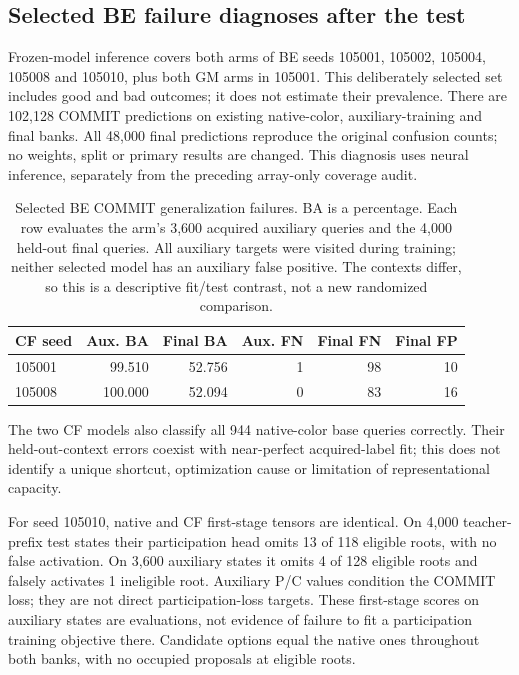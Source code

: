 \subsection{Selected BE failure diagnoses after the test}\label{app:be-failure-diagnostics}
Frozen-model inference covers both arms of BE seeds 105001, 105002, 105004,
105008 and 105010, plus both GM arms in 105001. This deliberately selected
set includes good and bad outcomes; it does not estimate their prevalence.
There are 102,128 COMMIT predictions on existing native-color,
auxiliary-training and final banks. All 48,000 final predictions
reproduce the original confusion counts; no weights, split or primary
results are changed. This diagnosis uses neural inference, separately from
the preceding array-only coverage audit.


\begin{table}[htbp]\centering\small
\begin{tabular}{lrrrrr}
\toprule CF seed & Aux. BA & Final BA & Aux. FN & Final FN & Final FP \\
\midrule
105001 & 99.510 & 52.756 & 1 & 98 & 10 \\
105008 & 100.000 & 52.094 & 0 & 83 & 16 \\
\bottomrule
\end{tabular}
\caption{Selected BE COMMIT generalization failures. BA is a percentage.
Each row evaluates the arm's 3,600 acquired auxiliary queries and the 4,000
held-out final queries. All auxiliary targets were visited during training;
neither selected model has an auxiliary false positive. The contexts differ,
so this is a descriptive fit/test contrast, not a new randomized comparison.}
\label{tab:be-fit-test}
\end{table}

The two CF models also classify all 944 native-color base queries correctly.
Their held-out-context errors coexist with near-perfect acquired-label fit;
this does not identify a unique shortcut, optimization cause or limitation
of representational capacity.

For seed 105010, native and CF first-stage tensors are identical. On 4,000
teacher-prefix test states their participation head omits 13 of
118 eligible roots, with no false activation. On 3,600 auxiliary
states it omits 4 of 128 eligible roots and falsely activates
1 ineligible root. Auxiliary P/C values condition the COMMIT loss;
they are not direct participation-loss targets. These first-stage scores on
auxiliary states are evaluations, not evidence of failure to fit a
participation training objective there. Candidate options equal the native
ones throughout both banks, with no occupied proposals at eligible roots.

